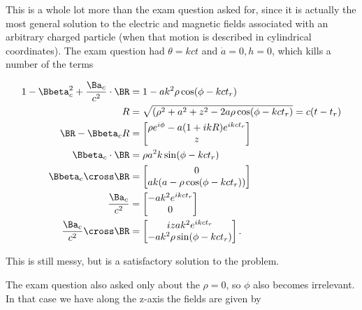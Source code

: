{This is a whole lot more than the exam question asked for, since it is actually the most general solution to the electric and magnetic fields associated with an arbitrary charged particle (when that motion is described in cylindrical coordinates).  The exam question had $\theta = k c t$ and $\dot{a} = 0, h = 0$, which kills a number of the terms

\begin{equation}\label{eqn:relativisticElectrodynamicsExamReflection:1010}
\begin{aligned}
1 - \Bbeta_c^2 + \frac{\Ba_c}{c^2} \cdot \BR &= 1 - a k^2 \rho \cos(\phi -  k c t_r) \\
R &= \sqrt{(\rho^2 + a^2 + z^2 - 2 a \rho \cos(\phi - k c t_r)} = c( t - t_r) \\
\BR - \Bbeta_c R &= 
\begin{bmatrix}
\rho e^{i\phi} - a (1 + i k R) e^{i k c t_r} \\
z 
\end{bmatrix} \\
\Bbeta_c \cdot \BR &= \rho a^2 k \sin(\phi -  k c t_r) \\
\Bbeta_c \cross \BR 
&=
\begin{bmatrix}
0 \\
a k ( a - \rho \cos(\phi -  k c t_r) )
\end{bmatrix} \\
\frac{\Ba_c}{c^2} &=
\begin{bmatrix}
- a k^2 e^{i k c t_r} \\
0
\end{bmatrix} \\
\frac{\Ba_c}{c^2} \cross \BR 
&=
\begin{bmatrix}
i z a k^2 e^{i k c t_r} \\
- a k^2 \rho \sin(\phi -  k c t_r)
\end{bmatrix}.
\end{aligned}
\end{equation}

This is still messy, but is a satisfactory solution to the problem.

The exam question also asked only about the $\rho = 0$, so $\phi$ also becomes irrelevant.  In that case we have along the z-axis the fields are given by

}
